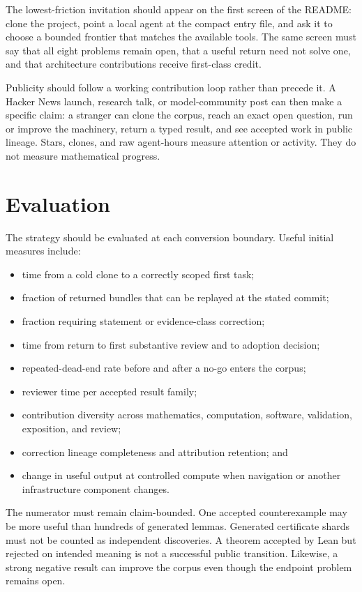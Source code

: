 \documentclass[10pt]{article}
\begin{document}
The lowest-friction invitation should appear on the first screen of the
README: clone the project, point a local agent at the compact entry file, and
ask it to choose a bounded frontier that matches the available tools.  The
same screen must say that all eight problems remain open, that a useful return
need not solve one, and that architecture contributions receive first-class
credit.

Publicity should follow a working contribution loop rather than precede it.
A Hacker News launch, research talk, or model-community post can then make a
specific claim: a stranger can clone the corpus, reach an exact open question,
run or improve the machinery, return a typed result, and see accepted work in
public lineage.  Stars, clones, and raw agent-hours measure attention or
activity.  They do not measure mathematical progress.

\section{Evaluation}\label{sec:evaluation}

The strategy should be evaluated at each conversion boundary.  Useful initial
measures include:

\begin{itemize}
\item time from a cold clone to a correctly scoped first task;
\item fraction of returned bundles that can be replayed at the stated commit;
\item fraction requiring statement or evidence-class correction;
\item time from return to first substantive review and to adoption decision;
\item repeated-dead-end rate before and after a no-go enters the corpus;
\item reviewer time per accepted result family;
\item contribution diversity across mathematics, computation, software,
      validation, exposition, and review;
\item correction lineage completeness and attribution retention; and
\item change in useful output at controlled compute when navigation or another
      infrastructure component changes.
\end{itemize}

The numerator must remain claim-bounded.  One accepted counterexample may be
more useful than hundreds of generated lemmas.  Generated certificate shards
must not be counted as independent discoveries.  A theorem accepted by Lean
but rejected on intended meaning is not a successful public transition.
Likewise, a strong negative result can improve the corpus even though the
endpoint problem remains open.
\end{document}
